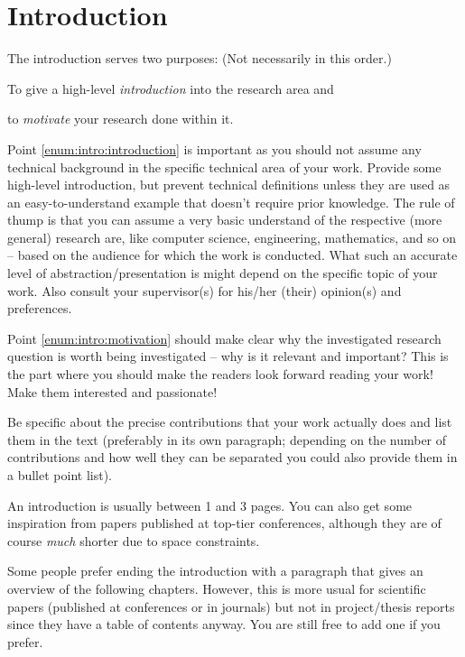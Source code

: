 \chapter{Introduction}

The introduction serves two purposes: \hfill (Not necessarily in this order.)
\begin{compactenum}
  \item To give a high-level \emph{introduction} into the research area and\label{enum:intro:introduction}
  \item to \emph{motivate} your research done within it.\label{enum:intro:motivation}
\end{compactenum}

Point \ref{enum:intro:introduction} is important as you should not assume any technical background in the specific technical area of your work. Provide some high-level introduction, but prevent technical definitions unless they are used as an easy-to-understand example that doesn't require prior knowledge. The rule of thump is that you can assume a very basic understand of the respective (more general) research are, like computer science, engineering, mathematics, and so on -- based on the audience for which the work is conducted. What such an accurate level of abstraction/presentation is might depend on the specific topic of your work. Also consult your supervisor(s) for his/her (their) opinion(s) and preferences. 

Point \ref{enum:intro:motivation} should make clear why the investigated research question is worth being investigated -- why is it relevant and important? This is the part where you should make the readers look forward reading your work! Make them interested and passionate!

Be specific about the precise contributions that your work actually does and list them in the text (preferably in its own paragraph; depending on the number of contributions and how well they can be separated you could also provide them in a bullet point list).

An introduction is usually between 1 and 3 pages. You can also get some inspiration from papers published at top-tier conferences, although they are of course \emph{much} shorter due to space constraints.

Some people prefer ending the introduction with a paragraph that gives an overview of the following chapters. However, this is more usual for scientific papers (published at conferences or in journals) but not in project/thesis reports since they have a table of contents anyway. You are still free to add one if you prefer.
